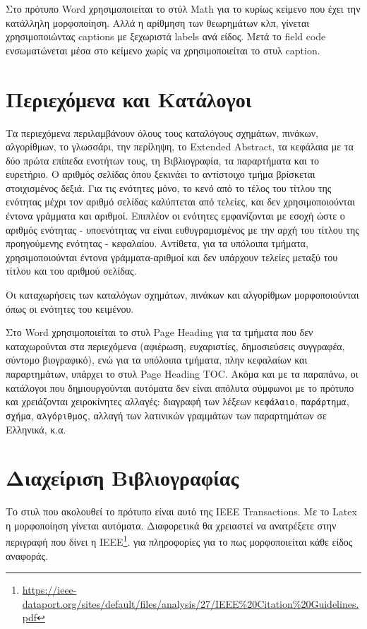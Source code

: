 Στο πρότυπο Word χρησιμοποιείται το στύλ Math για το κυρίως κείμενο που έχει την κατάλληλη μορφοποίηση.
Αλλά η αρίθμηση των θεωρημάτων κλπ, γίνεται χρησιμοποιώντας captions με ξεχωριστά labels ανά είδος.
Mετά το field code ενσωματώνεται μέσα στο κείμενο χωρίς να χρησιμοποιείται το στυλ caption.

\section{Περιεχόμενα και Κατάλογοι}
\label{subsec:Contents}

 Τα περιεχόμενα περιλαμβάνουν όλους τους καταλόγους σχημάτων, πινάκων, αλγορίθμων, το γλωσσάρι, την περίληψη, το Extended Abstract, τα κεφάλαια με τα δύο πρώτα επίπεδα ενοτήτων τους, τη Βιβλιογραφία, τα παραρτήματα και το ευρετήριο.
 Ο αριθμός σελίδας όπου ξεκινάει το αντίστοιχο τμήμα βρίσκεται στοιχισμένος δεξιά.
Για τις ενότητες μόνο, το κενό από το τέλος του τίτλου της ενότητας μέχρι τον αριθμό σελίδας καλύπτεται από τελείες, και δεν χρησιμοποιούνται έντονα γράμματα και αριθμοί.
 Επιπλέον οι ενότητες εμφανίζονται με εσοχή ώστε ο αριθμός ενότητας - υποενότητας να είναι ευθυγραμισμένος με την αρχή του τίτλου της προηγούμενης ενότητας - κεφαλαίου.
 Αντίθετα, για τα υπόλοιπα τμήματα, χρησιμοποιούνται έντονα γράμματα-αριθμοί και δεν υπάρχουν τελείες μεταξύ του τίτλου και του αριθμού σελίδας.

 Οι καταχωρήσεις των καταλόγων σχημάτων, πινάκων και αλγορίθμων μορφοποιούνται όπως οι ενότητες του κειμένου.

 Στο Word χρησιμοποιείται το στυλ Page Heading για τα τμήματα που δεν καταχωρούνται στα περιεχόμενα (αφιέρωση, ευχαριστίες, δημοσιεύσεις συγγραφέα, σύντομο βιογραφικό), ενώ για τα υπόλοιπα τμήματα, πλην κεφαλαίων και παραρτημάτων, υπάρχει το στυλ Page Heading TOC.
 Ακόμα και με τα παραπάνω, οι κατάλογοι που δημιουργούνται αυτόματα δεν είναι απόλυτα σύμφωνοι με το πρότυπο και χρειάζονται χειροκίνητες αλλαγές: διαγραφή των λέξεων \texttt{κεφάλαιο}, \texttt{παράρτημα}, \texttt{σχήμα}, \texttt{αλγόριθμος}, αλλαγή των λατινικών γραμμάτων των παραρτημάτων σε Ελληνικά, κ.α.




\section{Διαχείριση Βιβλιογραφίας}
\label{sec:Bibliography}

Το στυλ που ακολουθεί το πρότυπο είναι αυτό της IEEE Transactions.
Με το Latex η μορφοποίηση γίνεται αυτόματα.
Διαφορετικά θα χρειαστεί να ανατρέξετε στην περιγραφή που δίνει η IEEE\footnote{\url{https://ieee-dataport.org/sites/default/files/analysis/27/IEEE\%20Citation\%20Guidelines.pdf}}.
για πληροφορίες για το πως μορφοποιείται κάθε είδος αναφοράς.

